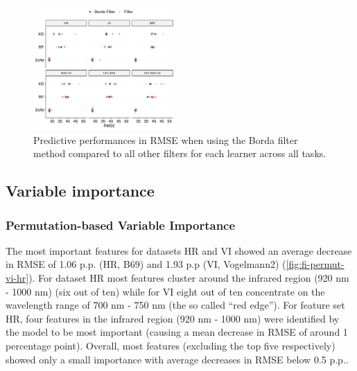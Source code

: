 \documentclass[peerreview]{IEEEtran}
\begin{document}
\begin{figure} [t!]
	\centering
	\begin{center}
		\includegraphics[width=0.48\textwidth] {filter-effect-all-vs-borda-filter-1.pdf}
		\caption{Predictive performances in RMSE when using the Borda filter method compared to all other filters for each learner across all tasks.}\label{fig:filter-effects-borda}
	\end{center}
\end{figure}

\subsection{Variable importance}

\subsubsection{Permutation-based Variable Importance}


The most important features for datasets HR and VI showed an average decrease in RMSE of 1.06 p.p. (HR, B69) and 1.93 p.p (VI, Vogelmann2) (\autoref{fig:fi-permut-vi-hr}).
For dataset HR most features cluster around the infrared region (920 nm - 1000 nm) (six out of ten) while for VI eight out of ten concentrate on the wavelength range of 700 nm - 750 nm (the so called \enquote{red edge}).
For feature set HR, four features in the infrared region (920 nm - 1000 nm) were identified by the model to be most important (causing a mean decrease in RMSE of around 1 percentage point).
Overall, most features (excluding the top five respectively) showed only a small importance with average decreases in RMSE below 0.5 p.p..
\end{document}
